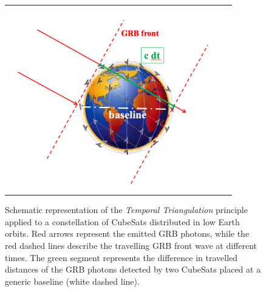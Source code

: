 \documentclass[]{spie}  %
\begin{document}
\begin{figure}
\begin{center}
\begin{tabular}{c}
\includegraphics[height=8cm]{triangulation} 
\end{tabular}
\end{center}
\caption[example] 
{ \label{fig:triangulation} 
Schematic representation of the \emph{Temporal Triangulation} principle applied to a constellation of CubeSats distributed in low Earth orbits. Red arrows represent the emitted GRB photons, while the red dashed lines describe the travelling GRB front wave at different times. The green segment represents the difference in travelled distances of the GRB photons detected by two CubeSats placed at a generic baseline (white dashed line).}
\end{figure} 
\end{document}
